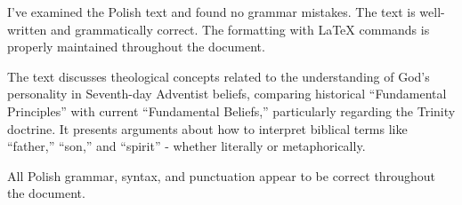 I've examined the Polish text and found no grammar mistakes. The text is well-written and grammatically correct. The formatting with LaTeX commands is properly maintained throughout the document.

The text discusses theological concepts related to the understanding of God's personality in Seventh-day Adventist beliefs, comparing historical “Fundamental Principles” with current “Fundamental Beliefs,” particularly regarding the Trinity doctrine. It presents arguments about how to interpret biblical terms like “father,” “son,” and “spirit” - whether literally or metaphorically.

All Polish grammar, syntax, and punctuation appear to be correct throughout the document.